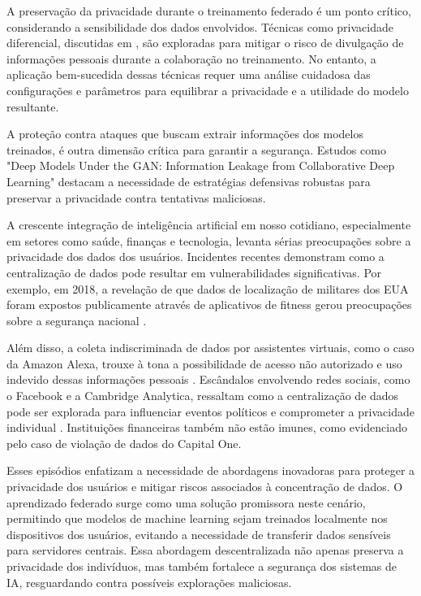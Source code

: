 A preservação da privacidade durante o treinamento federado é um ponto crítico, considerando a sensibilidade dos dados envolvidos. Técnicas como privacidade diferencial, discutidas em \cite{shokri2015privacy}, são exploradas para mitigar o risco de divulgação de informações pessoais durante a colaboração no treinamento. No entanto, a aplicação bem-sucedida dessas técnicas requer uma análise cuidadosa das configurações e parâmetros para equilibrar a privacidade e a utilidade do modelo resultante.

A proteção contra ataques que buscam extrair informações dos modelos treinados, é outra dimensão crítica para garantir a segurança. Estudos como "Deep Models Under the GAN: Information Leakage from Collaborative Deep Learning"\cite{hitaj2017deep} destacam a necessidade de estratégias defensivas robustas para preservar a privacidade contra tentativas maliciosas.

A crescente integração de inteligência artificial em nosso cotidiano, especialmente em setores como saúde, finanças e tecnologia, levanta sérias preocupações sobre a privacidade dos dados dos usuários. Incidentes recentes demonstram como a centralização de dados pode resultar em vulnerabilidades significativas. Por exemplo, em 2018, a revelação de que dados de localização de militares dos EUA foram expostos publicamente através de aplicativos de fitness gerou preocupações sobre a segurança nacional \cite{bbc2018strava}. 

Além disso, a coleta indiscriminada de dados por assistentes virtuais, como o caso da Amazon Alexa, trouxe à tona a possibilidade de acesso não autorizado e uso indevido dessas informações pessoais \cite{bloomberg2019amazon}. Escândalos envolvendo redes sociais, como o Facebook e a Cambridge Analytica, ressaltam como a centralização de dados pode ser explorada para influenciar eventos políticos e comprometer a privacidade individual \cite{guardian2018cambridge}. Instituições financeiras também não estão imunes, como evidenciado pelo caso de violação de dados do Capital One\cite{capitalone2019databreach}. 

Esses episódios enfatizam a necessidade de abordagens inovadoras para proteger a privacidade dos usuários e mitigar riscos associados à concentração de dados. O aprendizado federado surge como uma solução promissora neste cenário, permitindo que modelos de machine learning sejam treinados localmente nos dispositivos dos usuários, evitando a necessidade de transferir dados sensíveis para servidores centrais. Essa abordagem descentralizada não apenas preserva a privacidade dos indivíduos, mas também fortalece a segurança dos sistemas de IA, resguardando contra possíveis explorações maliciosas. 

